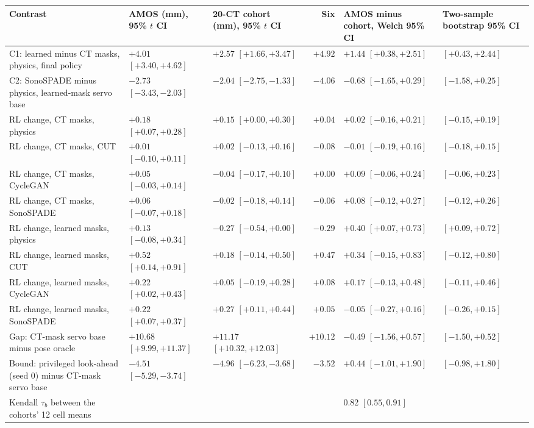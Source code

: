 \begin{table}[tp]
\medskip
\begin{tabularx}{\textwidth}{@{}>{\raggedright\arraybackslash}X l l r l l@{}}
\toprule
Contrast & AMOS (mm), 95\% $t$ CI & 20-CT cohort (mm), 95\% $t$ CI & Six & AMOS minus cohort, Welch 95\% CI & Two-sample bootstrap 95\% CI \\
\midrule
\quad C1: learned minus CT masks, physics, final policy & $+4.01$ $[+3.40, +4.62]$ & $+2.57$ $[+1.66, +3.47]$ & $+4.92$ & $+1.44$ $[+0.38, +2.51]$ & $[+0.43, +2.44]$ \\
\quad C2: SonoSPADE minus physics, learned-mask servo base & $-2.73$ $[-3.43, -2.03]$ & $-2.04$ $[-2.75, -1.33]$ & $-4.06$ & $-0.68$ $[-1.65, +0.29]$ & $[-1.58, +0.25]$ \\
\quad RL change, CT masks, physics & $+0.18$ $[+0.07, +0.28]$ & $+0.15$ $[+0.00, +0.30]$ & $+0.04$ & $+0.02$ $[-0.16, +0.21]$ & $[-0.15, +0.19]$ \\
\quad RL change, CT masks, CUT & $+0.01$ $[-0.10, +0.11]$ & $+0.02$ $[-0.13, +0.16]$ & $-0.08$ & $-0.01$ $[-0.19, +0.16]$ & $[-0.18, +0.15]$ \\
\quad RL change, CT masks, CycleGAN & $+0.05$ $[-0.03, +0.14]$ & $-0.04$ $[-0.17, +0.10]$ & $+0.00$ & $+0.09$ $[-0.06, +0.24]$ & $[-0.06, +0.23]$ \\
\quad RL change, CT masks, SonoSPADE & $+0.06$ $[-0.07, +0.18]$ & $-0.02$ $[-0.18, +0.14]$ & $-0.06$ & $+0.08$ $[-0.12, +0.27]$ & $[-0.12, +0.26]$ \\
\quad RL change, learned masks, physics & $+0.13$ $[-0.08, +0.34]$ & $-0.27$ $[-0.54, +0.00]$ & $-0.29$ & $+0.40$ $[+0.07, +0.73]$ & $[+0.09, +0.72]$ \\
\quad RL change, learned masks, CUT & $+0.52$ $[+0.14, +0.91]$ & $+0.18$ $[-0.14, +0.50]$ & $+0.47$ & $+0.34$ $[-0.15, +0.83]$ & $[-0.12, +0.80]$ \\
\quad RL change, learned masks, CycleGAN & $+0.22$ $[+0.02, +0.43]$ & $+0.05$ $[-0.19, +0.28]$ & $+0.08$ & $+0.17$ $[-0.13, +0.48]$ & $[-0.11, +0.46]$ \\
\quad RL change, learned masks, SonoSPADE & $+0.22$ $[+0.07, +0.37]$ & $+0.27$ $[+0.11, +0.44]$ & $+0.05$ & $-0.05$ $[-0.27, +0.16]$ & $[-0.26, +0.15]$ \\
\quad Gap: CT-mask servo base minus pose oracle & $+10.68$ $[+9.99, +11.37]$ & $+11.17$ $[+10.32, +12.03]$ & $+10.12$ & $-0.49$ $[-1.56, +0.57]$ & $[-1.50, +0.52]$ \\
\quad Bound: privileged look-ahead (seed 0) minus CT-mask servo base & $-4.51$ $[-5.29, -3.74]$ & $-4.96$ $[-6.23, -3.68]$ & $-3.52$ & $+0.44$ $[-1.01, +1.90]$ & $[-0.98, +1.80]$ \\
\quad Kendall $\tau_b$ between the cohorts' 12 cell means & & & & 0.82 $[0.55, 0.91]$ & \\
\bottomrule
\end{tabularx}
\end{table}
